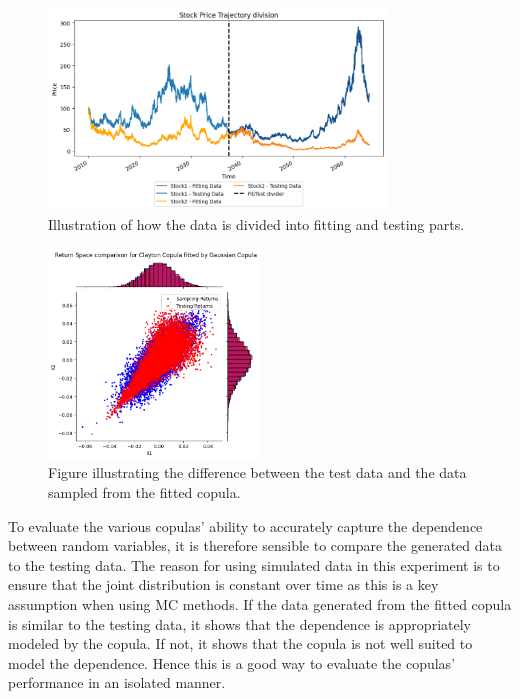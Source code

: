 \begin{figure}
    \centering
    \includegraphics[width=0.8\textwidth]{4Method/pictures/DataDivision.png}
    \caption{Illustration of how the data is divided into fitting and testing parts. }
    \label{fig:DataDivision}
\end{figure}

\begin{figure}
    \centering
    \includegraphics[width=0.5\textwidth]{4Method/pictures/TestSampleComparison.png}
    \caption{Figure illustrating the difference between the test data and the data sampled from the fitted copula. }
    \label{fig:TestSampleComparison}
\end{figure}

To evaluate the various copulas' ability to accurately capture the dependence between random variables, it is therefore sensible to compare the generated data to the testing data. The reason for using simulated data in this experiment is to ensure that the joint distribution is constant over time as this is a key assumption when using \gls{MC} methods. If the data generated from the fitted copula is similar to the testing data, it shows that the dependence is appropriately modeled by the copula. If not, it shows that the copula is not well suited to model the dependence. Hence this is a good way to evaluate the copulas' performance in an isolated manner. 

